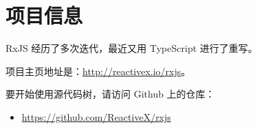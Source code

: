 \section{项目信息}


RxJS 经历了多次迭代，最近又用 TypeScript 进行了重写。


项目主页地址是：\url{http://reactivex.io/rxjs}。


要开始使用源代码树，请访问 Github 上的仓库：

\begin{itemize}
  \item \url{https://github.com/ReactiveX/rxjs}
\end{itemize}

